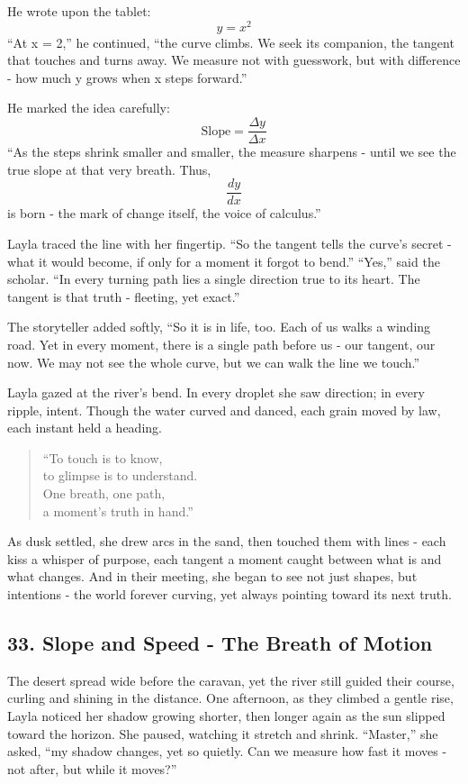\documentclass[
  letterpaper,
  DIV=11,
  numbers=noendperiod]{scrreprt}
\begin{document}
He wrote upon the tablet: \[
y = x^2
\] ``At x = 2,'' he continued, ``the curve climbs. We seek its
companion, the tangent that touches and turns away. We measure not with
guesswork, but with difference - how much y grows when x steps
forward.''

He marked the idea carefully: \[
\text{Slope} = \frac{\Delta y}{\Delta x}
\] ``As the steps shrink smaller and smaller, the measure sharpens -
until we see the true slope at that very breath. Thus, \[
\frac{dy}{dx}
\] is born - the mark of change itself, the voice of calculus.''

Layla traced the line with her fingertip. ``So the tangent tells the
curve's secret - what it would become, if only for a moment it forgot to
bend.'' ``Yes,'' said the scholar. ``In every turning path lies a single
direction true to its heart. The tangent is that truth - fleeting, yet
exact.''

The storyteller added softly, ``So it is in life, too. Each of us walks
a winding road. Yet in every moment, there is a single path before us -
our tangent, our now. We may not see the whole curve, but we can walk
the line we touch.''

Layla gazed at the river's bend. In every droplet she saw direction; in
every ripple, intent. Though the water curved and danced, each grain
moved by law, each instant held a heading.

\begin{quote}
``To touch is to know,\\
to glimpse is to understand.\\
One breath, one path,\\
a moment's truth in hand.''
\end{quote}

As dusk settled, she drew arcs in the sand, then touched them with lines
- each kiss a whisper of purpose, each tangent a moment caught between
what is and what changes. And in their meeting, she began to see not
just shapes, but intentions - the world forever curving, yet always
pointing toward its next truth.

\subsection{33. Slope and Speed - The Breath of
Motion}\label{slope-and-speed---the-breath-of-motion}

The desert spread wide before the caravan, yet the river still guided
their course, curling and shining in the distance. One afternoon, as
they climbed a gentle rise, Layla noticed her shadow growing shorter,
then longer again as the sun slipped toward the horizon. She paused,
watching it stretch and shrink. ``Master,'' she asked, ``my shadow
changes, yet so quietly. Can we measure how fast it moves - not after,
but while it moves?''
\end{document}
